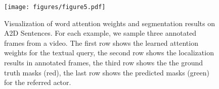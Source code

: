 \documentclass[journal]{IEEEtran}
\begin{document}
\begin{table}[!bt]
\begin{threeparttable}
\caption{The analysis of hyper-parameter }
\label{table:hyper-parameter}
\centering
{}
\end{threeparttable}
\vspace{-0.3cm}
\end{table}

\begin{figure}[!tb]
\centering
\texttt{[image: figures/figure5.pdf]}
\caption{Visualization of word attention weights and segmentation results on A2D Sentences. For each example, we sample three annotated frames from a video. The first row shows the learned attention weights for the textual query, the second row shows the localization results in annotated frames, the third row shows the the ground truth masks (red), the last row shows the predicted masks (green) for the referred actor.}
\label{fig:attn_visualization}
\vspace{-0.4cm}
\end{figure}
\end{document}
